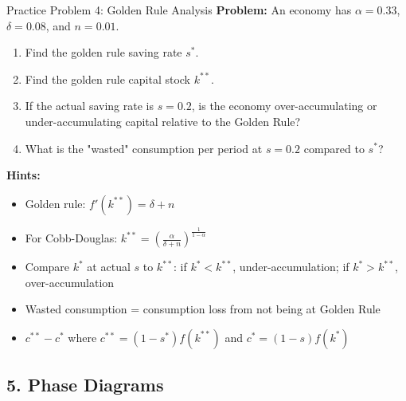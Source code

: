 \begin{frame}{Practice Problem 4: Golden Rule Analysis}
\textbf{Problem:} An economy has $\alpha = 0.33$, $\delta = 0.08$, and $n = 0.01$.
\begin{enumerate}
\item Find the golden rule saving rate $s^*$.
\item Find the golden rule capital stock $k^{**}$.
\item If the actual saving rate is $s = 0.2$, is the economy over-accumulating or under-accumulating capital relative to the Golden Rule?
\item What is the "wasted" consumption per period at $s = 0.2$ compared to $s^*$?
\end{enumerate}

\bigskip
\textbf{Hints:}
\begin{itemize}
\item Golden rule: $f'(k^{**}) = \delta + n$
\item For Cobb-Douglas: $k^{**} = \left(\frac{\alpha}{\delta + n}\right)^{\frac{1}{1-\alpha}}$
\item Compare $k^*$ at actual $s$ to $k^{**}$: if $k^* < k^{**}$, under-accumulation; if $k^* > k^{**}$, over-accumulation
\item Wasted consumption = consumption loss from not being at Golden Rule
\item $c^{**} - c^*$ where $c^{**} = (1-s^*)f(k^{**})$ and $c^* = (1-s)f(k^*)$
\end{itemize}

\end{frame}

\subsection{5. Phase Diagrams}

